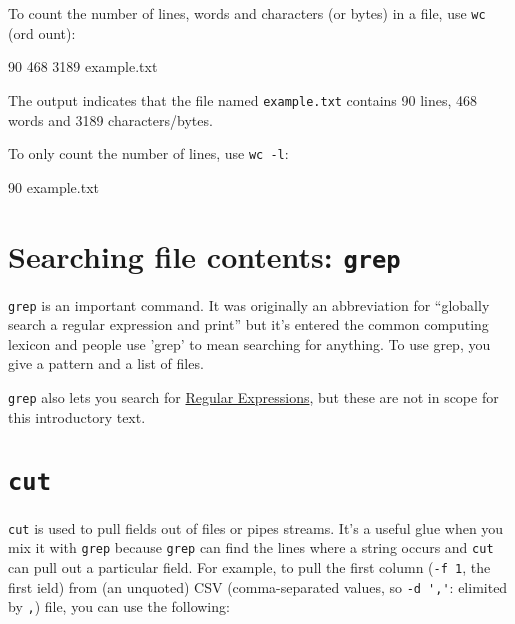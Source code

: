 To count the number of lines, words and characters (or bytes) in a file, use \lstinline|wc| (ord ount):

\begin{prompt}
      90     468    3189  example.txt
\end{prompt}

The output indicates that the file named \lstinline|example.txt| contains 90 lines, 468 words and 3189 characters/bytes.

To only count the number of lines, use \lstinline|wc -l|:

\begin{prompt}
      90    example.txt
\end{prompt}

\section{Searching file contents: \texttt{grep}}

\lstinline|grep| is an important command. It was originally an abbreviation for
``globally search a regular expression and print'' but it's entered the common
computing lexicon and people use 'grep' to mean searching for anything. To use
grep, you give a pattern and a list of files.

\begin{prompt}
\end{prompt}

\lstinline|grep| also lets you search for
\href{https://en.wikipedia.org/wiki/Regular_expression}{Regular Expressions}, but
these are not in scope for this introductory text.

\section{\texttt{cut}}

\lstinline|cut| is used to pull fields out of files or pipes streams.
It's a useful glue when you mix it with \lstinline|grep| because \lstinline|grep| can find the
lines where a string occurs and \lstinline|cut| can pull out a particular field. For
example, to pull the first column (\lstinline|-f 1|, the first ield)
from (an unquoted) CSV (comma-separated values, so \lstinline|-d ','|: elimited by \lstinline|,|)
file, you can use the following:

